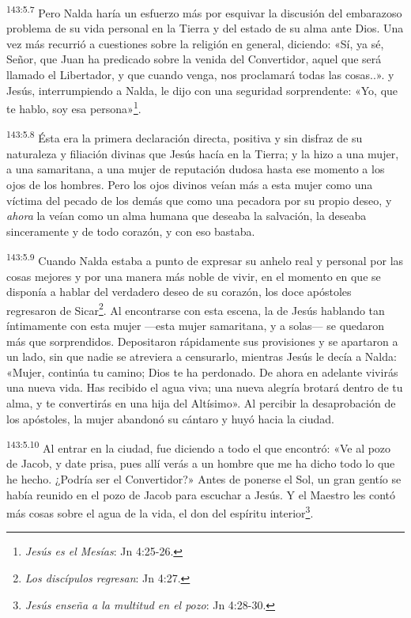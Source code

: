 \par
\textsuperscript{143:5.7} Pero Nalda haría un esfuerzo más por esquivar la discusión del embarazoso problema de su vida personal en la Tierra y del estado de su alma ante Dios. Una vez más recurrió a cuestiones sobre la religión en general, diciendo: «Sí, ya sé, Señor, que Juan ha predicado sobre la venida del Convertidor, aquel que será llamado el Libertador, y que cuando venga, nos proclamará todas las cosas..». y Jesús, interrumpiendo a Nalda, le dijo con una seguridad sorprendente: «Yo, que te hablo, soy esa persona»\footnote{\textit{Jesús es el Mesías}: Jn 4:25-26.}.

\par
\textsuperscript{143:5.8} Ésta era la primera declaración directa, positiva y sin disfraz de su naturaleza y filiación divinas que Jesús hacía en la Tierra; y la hizo a una mujer, a una samaritana, a una mujer de reputación dudosa hasta ese momento a los ojos de los hombres. Pero los ojos divinos veían más a esta mujer como una víctima del pecado de los demás que como una pecadora por su propio deseo, y \textit{ahora} la veían como un alma humana que deseaba la salvación, la deseaba sinceramente y de todo corazón, y con eso bastaba.

\par
\textsuperscript{143:5.9} Cuando Nalda estaba a punto de expresar su anhelo real y personal por las cosas mejores y por una manera más noble de vivir, en el momento en que se disponía a hablar del verdadero deseo de su corazón, los doce apóstoles regresaron de Sicar\footnote{\textit{Los discípulos regresan}: Jn 4:27.}. Al encontrarse con esta escena, la de Jesús hablando tan íntimamente con esta mujer ---esta mujer samaritana, y a solas--- se quedaron más que sorprendidos. Depositaron rápidamente sus provisiones y se apartaron a un lado, sin que nadie se atreviera a censurarlo, mientras Jesús le decía a Nalda: «Mujer, continúa tu camino; Dios te ha perdonado. De ahora en adelante vivirás una nueva vida. Has recibido el agua viva; una nueva alegría brotará dentro de tu alma, y te convertirás en una hija del Altísimo». Al percibir la desaprobación de los apóstoles, la mujer abandonó su cántaro y huyó hacia la ciudad.

\par
\textsuperscript{143:5.10} Al entrar en la ciudad, fue diciendo a todo el que encontró: «Ve al pozo de Jacob, y date prisa, pues allí verás a un hombre que me ha dicho todo lo que he hecho. ¿Podría ser el Convertidor?» Antes de ponerse el Sol, un gran gentío se había reunido en el pozo de Jacob para escuchar a Jesús. Y el Maestro les contó más cosas sobre el agua de la vida, el don del espíritu interior\footnote{\textit{Jesús enseña a la multitud en el pozo}: Jn 4:28-30.}.

